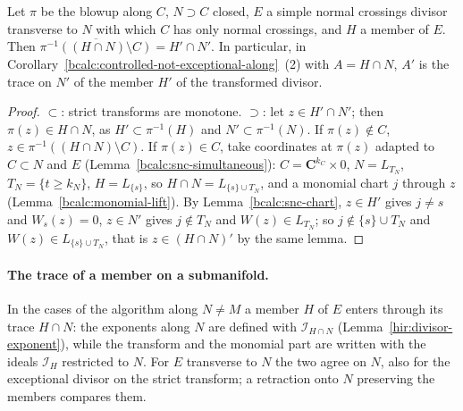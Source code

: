 \begin{lemma}
\label{bcalc:trace-strict-transform}
\leanok
Let \(\pi\) be the blowup along \(C\), \(N\supset C\) closed, \(E\) a simple normal crossings divisor transverse to \(N\) with which \(C\) has only normal
crossings, and \(H\) a member of \(E\). Then \(\overline{\pi^{-1}((H\cap N)\setminus C)}=H'\cap N'\). In particular, in Corollary~\ref{bcalc:controlled-not-exceptional-along}~(2)
with \(A=H\cap N\), \(A'\) is the trace on \(N'\) of the member \(H'\) of the transformed divisor.
\end{lemma}
\begin{proof}
\leanok
\(\subset\): strict transforms are monotone. \(\supset\): let \(z\in H'\cap N'\); then \(\pi(z)\in H\cap N\), as \(H'\subset\pi^{-1}(H)\) and \(N'\subset\pi^{-1}(N)\). If
\(\pi(z)\notin C\), \(z\in\pi^{-1}((H\cap N)\setminus C)\). If \(\pi(z)\in C\), take coordinates at \(\pi(z)\) adapted to \(C\subset N\) and \(E\)
(Lemma~\ref{bcalc:snc-simultaneous}): \(C=\mathbf C^{k_C}\times0\), \(N=L_{T_N}\), \(T_N=\{t\ge k_N\}\), \(H=L_{\{s\}}\), so \(H\cap N=L_{\{s\}\cup T_N}\), and a
monomial chart \(j\) through \(z\) (Lemma~\ref{bcalc:monomial-lift}). By Lemma~\ref{bcalc:snc-chart}, \(z\in H'\) gives \(j\ne s\) and \(W_s(z)=0\), \(z\in N'\)
gives \(j\notin T_N\) and \(W(z)\in L_{T_N}\); so \(j\notin\{s\}\cup T_N\) and \(W(z)\in L_{\{s\}\cup T_N}\), that is \(z\in(H\cap N)'\) by the same lemma.
\end{proof}

\paragraph{The trace of a member on a submanifold.} In the cases of the algorithm along \(N\ne M\) a member \(H\) of \(E\) enters through its trace
\(H\cap N\): the exponents along \(N\) are defined with \(\mathcal I_{H\cap N}\) (Lemma~\ref{hir:divisor-exponent}), while the transform and the monomial part are
written with the ideals \(\mathcal I_H\) restricted to \(N\). For \(E\) transverse to \(N\) the two agree on \(N\), also for the exceptional divisor on the strict
transform; a retraction onto \(N\) preserving the members compares them.

